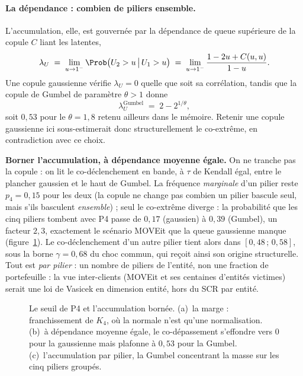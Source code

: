 \paragraph{La dépendance : combien de piliers ensemble.} L'accumulation, elle, est gouvernée par
la dépendance de queue supérieure de la copule $C$ liant les latentes,
\begin{equation}
  \lambda_U \;=\; \lim_{u\to 1^-}\Prob\bigl(U_2>u \,\big|\, U_1>u\bigr)
             \;=\; \lim_{u\to 1^-}\frac{1-2u+C(u,u)}{1-u} .
  \label{eq:lambda-U}
\end{equation}
Une copule gaussienne vérifie $\lambda_U=0$ quelle que soit sa corrélation, tandis que la copule
de Gumbel de paramètre $\theta>1$ donne
\begin{equation}
  \lambda_U^{\text{Gumbel}} \;=\; 2-2^{1/\theta},
  \label{eq:lambda-gumbel}
\end{equation}
soit $0{,}53$ pour le $\theta=1{,}8$ retenu ailleurs dans le mémoire. Retenir une copule
gaussienne ici sous-estimerait donc structurellement le co-extrême, en contradiction avec ce
choix.

\begin{attention}
\textbf{Borner l'accumulation, à dépendance moyenne égale.} On ne tranche pas la copule : on
lit le co-déclenchement en bande, à $\tau$ de Kendall égal, entre le plancher gaussien
et le haut de Gumbel. La fréquence \emph{marginale} d'un pilier reste $p_4=0{,}15$ pour les deux
(la copule ne change pas combien un pilier bascule seul, mais s'ils basculent \emph{ensemble}) ;
seul le co-extrême diverge : la probabilité que les cinq piliers tombent avec P4 passe
de $0{,}17$ (gaussien) à $0{,}39$ (Gumbel), un facteur $2{,}3$, exactement le scénario MOVEit
que la queue gaussienne manque (figure~\ref{fig:p4-seuil}). Le co-déclenchement d'un autre
pilier tient alors dans $[0{,}48\,;\,0{,}58]$, sous la borne $\gamma=0{,}68$ du choc commun, qui
reçoit ainsi son origine structurelle. Tout est \emph{par pilier} : un nombre de piliers de
l'entité, non une fraction de portefeuille : la vue inter-clients (MOVEit et ses centaines
d'entités victimes) serait une loi de Vasicek en dimension entité, hors du SCR par entité.
\end{attention}

\begin{figure}[htbp]\centering
{}
\caption{Le seuil de P4 et l'accumulation bornée. (a)~la marge : franchissement de $K_4$, où la
normale n'est qu'une normalisation. (b)~à dépendance moyenne égale, le co-dépassement s'effondre
vers $0$ pour la gaussienne mais plafonne à $0{,}53$ pour la Gumbel. (c)~l'accumulation par
pilier, la Gumbel concentrant la masse sur les cinq piliers groupés.}
\label{fig:p4-seuil}
\end{figure}

